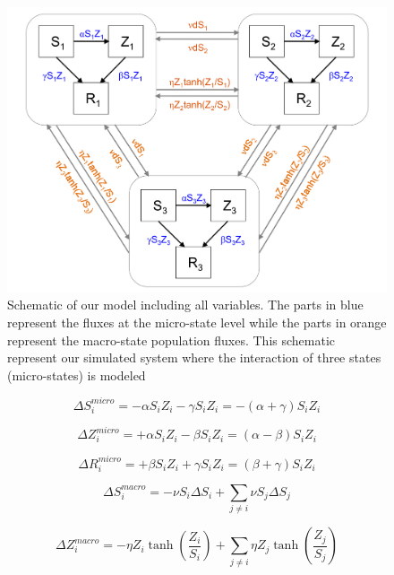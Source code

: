 \documentclass[11pt]{article}
\begin{document}
\begin{figure}[h!]
\centering
\includegraphics[scale=0.15]{Zombie_model.png}
\caption{Schematic of our model including all variables. The parts in blue represent the fluxes at the micro-state level while the parts in orange represent the macro-state population fluxes. This schematic represent our simulated system where the interaction of three states (micro-states) is modeled }
\end{figure}

\begin{equation}
\Delta S_{i}^{micro} = -\alpha S_{i} Z_{i} -\gamma S_{i} Z_{i} = -(\alpha + \gamma) S_{i} Z_{i}
\end{equation}

\begin{equation}
\Delta Z_{i}^{micro} = +\alpha S_{i} Z_{i} - \beta S_{i} Z_{i} = (\alpha - \beta) S_{i} Z_{i}
\end{equation}

\begin{equation}
\Delta R_{i}^{micro} = +\beta S_{i} Z_{i} + \gamma S_{i} Z_{i} = (\beta + \gamma) S_{i} Z_{i}
\end{equation}

\begin{equation}
\Delta S_{i}^{macro} = -\nu S_{i} \Delta S_{i} + \sum_{j\neq i}{\nu S_{j} \Delta S_{j}}
\end{equation}

\begin{equation}
\Delta Z_{i}^{macro} = -\eta Z_{i}\tanh (\frac{Z_{i}}{S_{i}}) + \sum_{j\neq i}{\eta Z_{j}\tanh (\frac{Z_{j}}{S_{j}})}
\end{equation}
\end{document}
